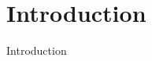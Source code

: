 \documentclass[aspectratio=169]{beamer}
\begin{document}



\section{Introduction}



\begin{frame}
    Introduction
\end{frame}
\end{document}
